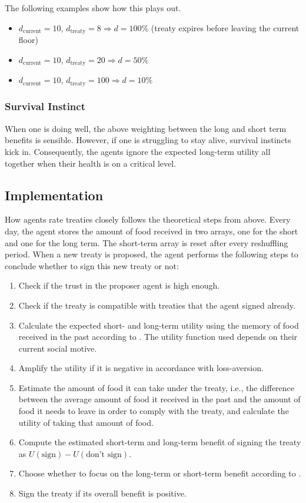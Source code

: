 The following examples show how this plays out.

\begin{itemize}
    \item $d_\text{current} = 10$, $d_\text{treaty} = 8\Rightarrow d=100\%$ (treaty expires before leaving the current floor)
    \item $d_\text{current} = 10$, $d_\text{treaty} = 20\Rightarrow d=50\%$
    \item $d_\text{current} = 10$, $d_\text{treaty} = 100\Rightarrow d = 10\%$
\end{itemize}


\subsubsection{Survival Instinct}

When one is doing well, the above weighting between the long and short term benefits is sensible. However, if one is struggling to stay alive, survival instincts kick in. Consequently, the agents ignore the expected long-term utility all together when their health is on a critical level.

\subsection{Implementation}

How agents rate treaties closely follows the theoretical steps from above. Every day, the agent stores the amount of food received in two arrays, one for the short and one for the long term. The short-term array is reset after every reshuffling period. When a new treaty is proposed, the agent performs the following steps to conclude whether to sign this new treaty or not:
\begin{enumerate}
    \item Check if the trust in the proposer agent is high enough.
    \item Check if the treaty is compatible with treaties that the agent signed already.
    \item Calculate the expected short- and long-term utility using the memory of food received in the past according to . The utility function used depends on their current social motive.
    \item Amplify the utility if it is negative in accordance with loss-aversion.
    \item Estimate the amount of food it can take under the treaty, i.e., the difference between the average amount of food it received in the past and the amount of food it needs to leave in order to comply with the treaty, and calculate the utility of taking that amount of food.
    \item Compute the estimated short-term and long-term benefit of signing the treaty as $U(\text{sign}) - U(\text{don’t sign})$.
    \item Choose whether to focus on the long-term or short-term benefit according to .
    \item Sign the treaty if its overall benefit is positive.
\end{enumerate}

